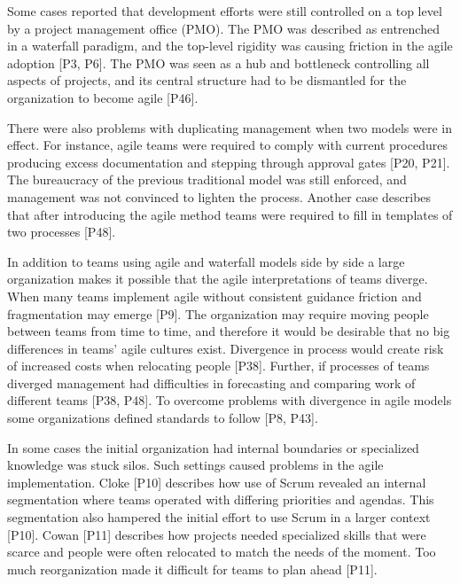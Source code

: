 \documentclass[preprint,authoryear,12pt]{elsarticle}
\begin{document}
Some cases reported that development efforts were still controlled on a top
level by a project management office (PMO). The PMO was described as entrenched
in a waterfall paradigm, and the top-level rigidity was causing friction in the
agile adoption [P3, P6]. The PMO was seen as a hub and bottleneck controlling
all aspects of projects, and its central structure had to be dismantled for the
organization to become agile [P46].

There were also problems with duplicating management when two models were in
effect. For instance, agile teams were required to comply with current
procedures producing excess documentation and stepping through approval gates
[P20, P21]. The bureaucracy of the previous traditional model was still enforced,
and management was not convinced to lighten the process. Another case describes
that after introducing the agile method teams were required to fill in templates
of two processes [P48].


In addition to teams using agile and waterfall models side by side a large
organization makes it possible that the agile interpretations of teams diverge.
When many teams implement agile without consistent guidance friction and
fragmentation may emerge [P9]. The organization may require moving people
between teams from time to time, and therefore it would be desirable that no big
differences in teams' agile cultures exist. Divergence in process would create
risk of increased costs when relocating people [P38].
Further, if processes of teams diverged management had difficulties in
forecasting and comparing work of different teams [P38, P48]. To overcome
problems with divergence in agile models some organizations defined standards to
follow [P8, P43].

In some cases the initial organization had internal boundaries or specialized
knowledge was stuck silos. Such settings caused problems in the agile
implementation.
Cloke [P10] describes how use of Scrum revealed an internal segmentation where
teams operated with differing priorities and agendas. This segmentation also
hampered the initial effort to use Scrum in a larger context [P10].
Cowan [P11] describes how projects needed specialized skills that were scarce
and people were often relocated to match the needs of the moment. Too much
reorganization made it difficult for teams to plan ahead [P11].
\end{document}
